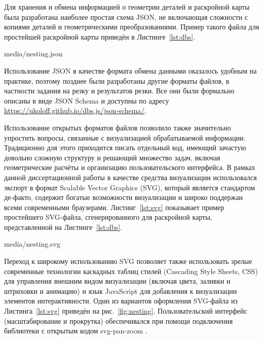 Для хранения и обмена информацией о геометрии деталей
и раскройной карты
была разработана наиболее простая схема JSON,
не включающая сложности с копиями деталей и геометрическими
преобразованиями.
Пример такого файла для простейшей раскройной карты
приведён в Листинге~\ref{lst:dbs}.


    {media/nesting.json}

Использование JSON
в качестве формата обмена данными
оказалось удобным на практике,
поэтому позднее были разработаны другие
форматы файлов, в частности
задания на резку и результатов резки.
Все они были формально описаны в
виде JSON Schema
\autocite*[]{bi:json-schema}
и доступны по адресу
\url{https://ukoloff.github.io/dbs.js/json-schema/}.

Использование открытых форматов файлов позволило
также значительно упростить вопросы,
связанные с визуализацией обрабатываемой информации.
Традиционно для этого приходится
писать отдельный код,
имеющий зачастую довольно сложную структуру и решающий
множество задач, включая геометрические расчёты
и организацию пользовательского интерфейса.
В рамках данной диссертационной работы
в качестве средства визуализации
использовался экспорт в формат
Scalable Vector Graphics
(SVG),
который является стандартом де-факто,
содержит богатые возможности визуализации
и широко поддержан всеми современными браузерами.
Листинг~\ref{lst:svg}
показывает пример простейшего SVG-файла,
сгенерированного для раскройной карты,
представленной на Листинге~\ref{lst:dbs}.


  {media/nesting.svg}

Переход к широкому использованию SVG
позволяет также использовать зрелые современные технологии
каскадных таблиц стилей
(Cascading Style Sheets, CSS)
для управления внешним видом визуализации
(включая цвета, заливки и штриховки и анимацию)
и язык JavaScript
для добавления к визуализации
элементов интерактивности.
Один из вариантов оформления
SVG-файла из Листинга~\ref{lst:svg}
приведён на рис.~\ref{fig:nesting}.
Пользовательский интерфейс
(масштабирование и прокрутка)
обеспечивался при помощи подключения
библиотеки с открытым кодом
svg-pan-zoom
\autocite*{bi:svg-pan-zoom}.

